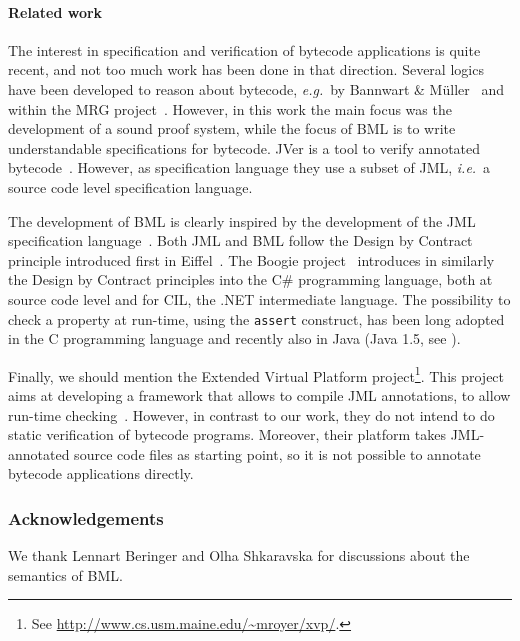 \paragraph{Related work}
The interest in specification and verification of bytecode
applications is quite recent, and not too much work has been done in
that direction. Several logics have been developed to reason about
bytecode, \emph{e.g.}~by Bannwart \& M\"uller~\cite{BannwartMueller05}
and within the MRG project~\cite{AspinallEtAl:TPHOLs2004}. However, in
this work the main focus was the development of a sound proof system,
while the focus of BML is to write understandable specifications for
bytecode. JVer is a tool to verify annotated
bytecode~\cite{ChanderEILN05}. However, as specification language they
use a subset of JML, \emph{i.e.}\ a source code level specification language.

The development of BML is clearly inspired by the development of the
JML specification language~\cite{JMLReferenceManual05}. Both JML and
BML follow the Design by Contract principle introduced first in
Eiffel~\cite{Meyer97}. The Boogie project~\cite{BarnettCDJL05}
introduces in similarly the Design by Contract principles into the C\#
programming language, both at source code level and for CIL, the .NET
intermediate language.  The possibility to check a property at
run-time, using the \texttt{assert} construct, has been long 
adopted in the C programming language and recently also in Java (Java
1.5, see \cite[\S 14.10]{JLS}). 

Finally, we should mention the Extended Virtual Platform
project\footnote{See
\url{http://www.cs.usm.maine.edu/~mroyer/xvp/}.}. This project aims at
developing a framework that allows to compile JML annotations, to
allow run-time checking~\cite{AlagicXVP05}. However, in contrast to
our work, they do not intend to do static verification of bytecode
programs. Moreover, their platform takes JML-annotated source code
files as starting point, so it is not possible to annotate bytecode
applications directly.


\subsubsection*{Acknowledgements}
We thank Lennart Beringer and Olha Shkaravska for discussions about
the semantics of BML. 
\vspace*{-.5em}
